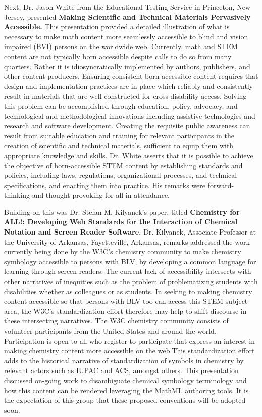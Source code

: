 \documentclass[11.5pt]{sig-alternate}
\begin{document}
\begin{large}
Next, Dr. Jason White from the Educational Testing Service in Princeton, New Jersey, presented \textbf{Making Scientific and Technical Materials Pervasively Accessible.} This presentation provided a detailed illustration of what is necessary to make math content more seamlessly accessible to blind and vision impaired (BVI) persons on the worldwide web. Currently, math and STEM content are not typically born accessible despite calls to do so from many quarters. Rather it is idiosyncratically implemented by authors, publishers, and other content producers. Ensuring consistent born accessible content requires that design and implementation practices are in place which reliably and consistently result in materials that are well constructed for cross-disability access. Solving this problem can be accomplished through education, policy, advocacy, and technological and methodological innovations including assistive technologies and research and software development. Creating the requisite public awareness can result from suitable education and training for relevant participants in the creation of scientific and technical materials, sufficient to equip them with appropriate knowledge and skills. Dr. White asserts that it is possible to achieve the objective of born-accessible STEM content by establishing standards and policies, including laws, regulations, organizational processes, and technical specifications, and enacting them into practice. His remarks were forward-thinking and thought provoking for all in attendance.

Building on this was Dr. Stefan M. Kilyanek’s paper, titled \textbf{Chemistry for ALL!: Developing Web Standards for the Interaction of Chemical Notation and Screen Reader Software.} Dr. Kilyanek, Associate Professor at the University of Arkansas, Fayetteville, Arkansas, remarks addressed the work currently being done by the W3C’s chemistry community to make chemistry symbology accessible to persons with BLV, by developing a common language for learning through screen-readers. The current lack of accessibility intersects with other narratives of inequities such as the problem of problematizing students with disabilities whether as colleagues or as students. In seeking to making chemistry content accessible so that persons with BLV too can access this STEM subject area, the W3C’s standardization effort therefore may help to shift discourse in these intersecting narratives. The W3C chemistry community consists of volunteer participants from the United States and around the world. Participation is open to all who register to participate that express an interest in making chemistry content more accessible on the web.This standardization effort adds to the historical narrative of standardization of symbols in chemistry by relevant actors such as IUPAC and ACS, amongst others. This presentation discussed on-going work to disambiguate chemical symbology terminology and how this content can be rendered leveraging the MathML authoring tools. It is the expectation of this group that these proposed conventions will be adopted soon.


\end{large}
\end{document}

